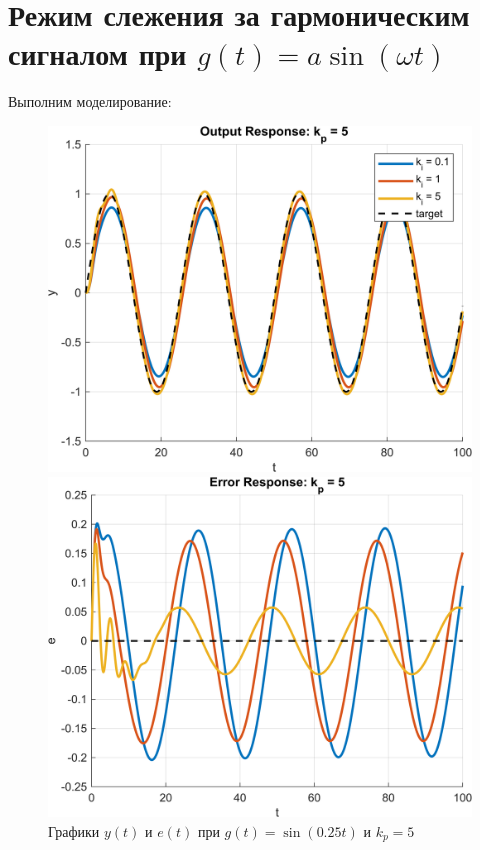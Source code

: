 \section{Режим слежения за гармоническим сигналом при $g(t) = a\sin(\omega t)$}
Выполним моделирование:
\begin{figure}[H]
    \centering
    \begin{minipage}{0.45\textwidth}
        \centering
        \includegraphics[width=1\textwidth, trim={1cm 0cm 1cm 0cm}]{../images/input_4_kp_5_output.png}
    \end{minipage}
    \hfill
    \begin{minipage}{0.45\textwidth}
        \centering
        \includegraphics[width=1\textwidth, trim={1cm 0cm 1cm 0cm}]{../images/input_4_kp_5_error.png}
    \end{minipage}
    \caption{Графики $y(t)$ и $e(t)$ при $g(t) = \sin(0.25t)$ и $k_p = 5$}
\end{figure}
